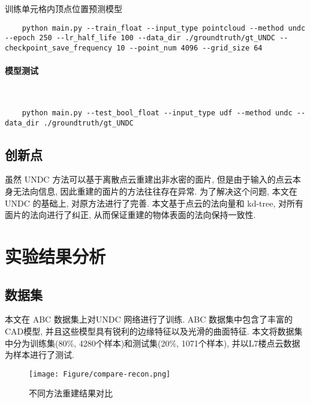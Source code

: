 训练单元格内顶点位置预测模型
\lstset{language=bash}
\begin{lstlisting}
    python main.py --train_float --input_type pointcloud --method undc --epoch 250 --lr_half_life 100 --data_dir ./groundtruth/gt_UNDC --checkpoint_save_frequency 10 --point_num 4096 --grid_size 64
\end{lstlisting}

\paragraph{模型测试}~{}
\lstset{language=bash}
\begin{lstlisting}
    python main.py --test_bool_float --input_type udf --method undc --data_dir ./groundtruth/gt_UNDC
\end{lstlisting}


\subsection{创新点}
虽然 UNDC 方法可以基于离散点云重建出非水密的面片, 但是由于输入的点云本身无法向信息, 因此重建的面片的方法往往存在异常. 为了解决这个问题, 本文在 UNDC 的基础上, 对原方法进行了完善. 本文基于点云的法向量和 kd-tree, 对所有面片的法向进行了纠正, 从而保证重建的物体表面的法向保持一致性. 

\section{实验结果分析}

\subsection{数据集}
本文在 ABC 数据集上对UNDC 网络进行了训练. ABC 数据集中包含了丰富的CAD模型, 并且这些模型具有锐利的边缘特征以及光滑的曲面特征. 本文将数据集中分为训练集(80\%, 4280个样本)和测试集(20\%, 1071个样本), 并以L7楼点云数据为样本进行了测试. 

\begin{figure}[H]
	\center
	\texttt{[image: Figure/compare-recon.png]}
	\centering
	\caption{不同方法重建结果对比}\label{fig:fig-compare}
\end{figure}

